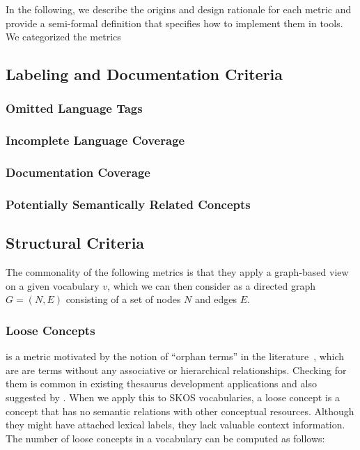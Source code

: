 In the following, we describe the origins and design rationale for each metric and provide a semi-formal definition that specifies how to implement them in tools. We categorized the metrics 


\subsection{Labeling and Documentation Criteria}

\subsubsection{Omitted Language Tags}

\subsubsection{Incomplete Language Coverage}

\subsubsection{Documentation Coverage}

\subsubsection{Potentially Semantically Related Concepts}



\subsection{Structural Criteria}

The commonality of the following metrics is that they apply a graph-based view on a given vocabulary \(v\), which we can then consider as a directed graph \(G=(N,E)\) consisting of a set of nodes \(N\) and edges \(E\).

\subsubsection{Loose Concepts} is a metric motivated by the notion of ``orphan terms'' in the literature~\cite{Hedden2010}, which are are terms without any associative or hierarchical relationships. Checking for them is common in existing thesaurus development applications and also suggested by \cite{Z39.19:2005}. When we apply this to SKOS vocabularies, a loose concept is a concept that has no semantic relations with other conceptual resources. Although they might have attached lexical labels, they lack valuable context information. The number of loose concepts in a vocabulary can be computed as follows: 

